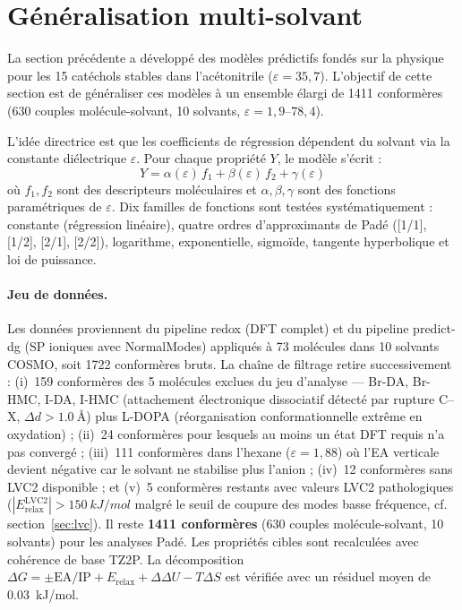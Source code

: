 \section{Généralisation multi-solvant}
\label{sec:s4_general}
\label{sec:generalisation}

La section précédente a développé des modèles prédictifs fondés sur la physique pour les 15 catéchols stables dans l'acétonitrile ($\varepsilon = 35{,}7$). L'objectif de cette section est de généraliser ces modèles à un ensemble élargi de 1411 conformères (630 couples molécule-solvant, 10 solvants, $\varepsilon = 1{,}9$--$78{,}4$).

L'idée directrice est que les coefficients de régression dépendent du solvant via la constante diélectrique $\varepsilon$. Pour chaque propriété $Y$, le modèle s'écrit :
\begin{equation}
    Y = \alpha(\varepsilon)\,f_1 + \beta(\varepsilon)\,f_2 + \gamma(\varepsilon)
    \label{eq:general_model}
\end{equation}
où $f_1, f_2$ sont des descripteurs moléculaires et $\alpha, \beta, \gamma$ sont des fonctions paramétriques de $\varepsilon$. Dix familles de fonctions sont testées systématiquement : constante (régression linéaire), quatre ordres d'approximants de Padé ([1/1], [1/2], [2/1], [2/2]), logarithme, exponentielle, sigmoïde, tangente hyperbolique et loi de puissance.

\paragraph{Jeu de données.} Les données proviennent du pipeline redox (DFT complet) et du pipeline predict-dg (SP ioniques avec NormalModes) appliqués à 73 molécules dans 10 solvants COSMO, soit 1722 conformères bruts. La chaîne de filtrage retire successivement : (i)~159 conformères des 5 molécules exclues du jeu d'analyse --- Br-DA, Br-HMC, I-DA, I-HMC (attachement électronique dissociatif détecté par rupture C--X, $\Delta d > \SI{1.0}{\angstrom}$) plus L-DOPA (réorganisation conformationnelle extrême en oxydation) ; (ii)~24 conformères pour lesquels au moins un état DFT requis n'a pas convergé ; (iii)~111 conformères dans l'hexane ($\varepsilon = 1{,}88$) où l'EA verticale devient négative car le solvant ne stabilise plus l'anion ; (iv)~12 conformères sans LVC2 disponible ; et (v)~5 conformères restants avec valeurs LVC2 pathologiques ($|E_\text{relax}^\text{LVC2}| > \SI{150}{kJ/mol}$ malgré le seuil de coupure des modes basse fréquence, cf. section~\ref{sec:lvc}). Il reste \textbf{1411 conformères} (630 couples molécule-solvant, 10 solvants) pour les analyses Padé. Les propriétés cibles sont recalculées avec cohérence de base TZ2P. La décomposition $\Delta G = \pm\text{EA/IP} + E_\text{relax} + \Delta\Delta U - T\Delta S$ est vérifiée avec un résiduel moyen de \SI{0.03}{kJ/mol}.

